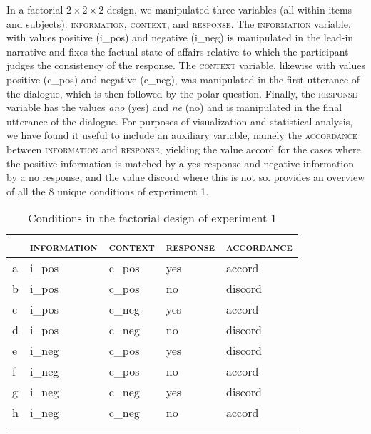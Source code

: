 \documentclass[output=paper,colorlinks,citecolor=brown]{langscibook}
\begin{document}
\noindent In a factorial $2\times 2\times 2$ design, we manipulated three variables (all within items and subjects): \textsc{information}, \textsc{context}, and \textsc{response}.
The \textsc{information} variable, with values \textsf{positive} (\textsf{i\_pos}) and \textsf{negative} (\textsf{i\_neg}) is manipulated in the lead-in narrative and fixes the factual state of affairs relative to which the participant judges the consistency of the response. The \textsc{context} variable, likewise with values \textsf{positive} (\textsf{c\_pos}) and \textsf{negative} (\textsf{c\_neg}), was manipulated in the first utterance of the dialogue, which is then followed by the polar question. Finally, the \textsc{response} variable has the values \textit{ano} (\textsf{yes}) and \textit{ne} (\textsf{no}) and is manipulated in the final utterance of the dialogue. For purposes of visualization and statistical analysis, we have found it useful to include an auxiliary variable, namely the \textsc{accordance} between \textsc{information} and \textsc{response}, yielding the value \textsf{accord} for the cases where the \textsf{positive} information is matched by a \textsf{yes} response and \textsf{negative} information by a \textsf{no} response, and the value \textsf{discord} where this is not so.  provides an overview of all the 8 unique conditions of experiment 1.

\begin{table}[t]
    \begin{tabularx}{.8\textwidth}{llXXl}
    \lsptoprule
         &\textsc{information}&\textsc{context}&\textsc{response}&\textsc{accordance}\smallskip\\
         \midrule
a&\textsf{i\_pos}&\textsf{c\_pos}&\textsf{yes}&\textsf{accord}\\
b&\textsf{i\_pos}&\textsf{c\_pos}&\textsf{no}&\textsf{discord}\\
c&\textsf{i\_pos}&\textsf{c\_neg}&\textsf{yes}&\textsf{accord}\\
d&\textsf{i\_pos}&\textsf{c\_neg}&\textsf{no}&\textsf{discord}\\
e&\textsf{i\_neg}&\textsf{c\_pos}&\textsf{yes}&\textsf{discord}\\
f&\textsf{i\_neg}&\textsf{c\_pos}&\textsf{no}&\textsf{accord}\\
g&\textsf{i\_neg}&\textsf{c\_neg}&\textsf{yes}&\textsf{discord}\\
h&\textsf{i\_neg}&\textsf{c\_neg}&\textsf{no}&\textsf{accord}\\
    \lspbottomrule
    \end{tabularx}
    \caption{Conditions in the factorial design of experiment 1}
    \label{hrdsim:tab:exp1-cond}
\end{table}
\end{document}
